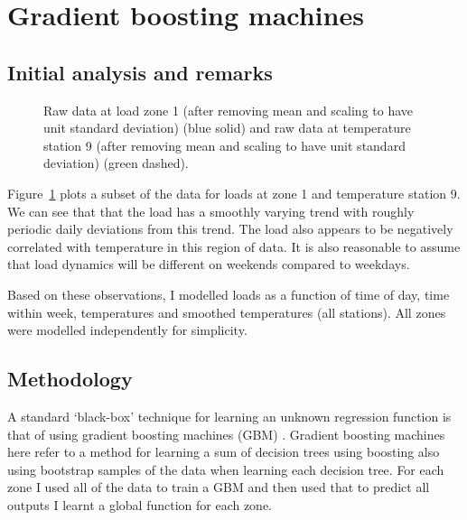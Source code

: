 \section{Gradient boosting machines}

\label{sec:gbm}

\subsection{Initial analysis and remarks}

\label{sec:gbm_init_anal}

\begin{figure}[ht]
  \begin{center}
    
  \end{center}
  \caption[Load data and corresponding temperature data.]{Raw data at load zone 1 (after removing mean and scaling to have unit standard deviation) (blue solid) and raw data at temperature station 9 (after removing mean and scaling to have unit standard deviation) (green dashed).}
  \label{fig:load_temp}
\end{figure}

Figure~\ref{fig:load_temp} plots a subset of the data for loads at zone 1 and temperature station 9.
We can see that that the load has a smoothly varying trend with roughly periodic daily deviations from this trend.
The load also appears to be negatively correlated with temperature in this region of data.
It is also reasonable to assume that load dynamics will be different on weekends compared to weekdays.

Based on these observations, I modelled loads as a function of time of day, time within week, temperatures and smoothed temperatures (all stations).
All zones were modelled independently for simplicity.

\subsection{Methodology}

A standard `black-box' technique for learning an unknown regression function is that of using gradient boosting machines (GBM) \citep[e.g. chapter 10 of][]{Hastie2009-hj}.
Gradient boosting machines here refer to a method for learning a sum of decision trees using boosting also using bootstrap samples of the data when learning each decision tree.
For each zone I used all of the data to train a GBM and then used that to predict all outputs \ie I learnt a global function for each zone.

